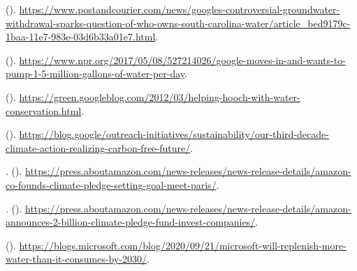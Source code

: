 \documentclass{article}
\begin{document}
\begin{thebibliography}{10}
\newblock {} ().
\newblock
  \urlprefix\url{https://www.postandcourier.com/news/googles-controversial-groundwater-withdrawal-sparks-question-of-who-owns-south-carolina-water/article_bed9179c-1baa-11e7-983e-03d6b33a01e7.html}.

\newblock {} ().
\newblock
  \urlprefix\url{https://www.npr.org/2017/05/08/527214026/google-moves-in-and-wants-to-pump-1-5-million-gallons-of-water-per-day}.

\newblock {} ().
\newblock
  \urlprefix\url{https://green.googleblog.com/2012/03/helping-hooch-with-water-conservation.html}.

\newblock {} ().
\newblock
  \urlprefix\url{https://blog.google/outreach-initiatives/sustainability/our-third-decade-climate-action-realizing-carbon-free-future/}.

.
\newblock {}
  ().
\newblock
  \urlprefix\url{https://press.aboutamazon.com/news-releases/news-release-details/amazon-co-founds-climate-pledge-setting-goal-meet-paris/}.

.
\newblock {}
  ().
\newblock
  \urlprefix\url{https://press.aboutamazon.com/news-releases/news-release-details/amazon-announces-2-billion-climate-pledge-fund-invest-companies/}.

\newblock {} ().
\newblock
  \urlprefix\url{https://blogs.microsoft.com/blog/2020/09/21/microsoft-will-replenish-more-water-than-it-consumes-by-2030/}.


\end{thebibliography}
\end{document}
